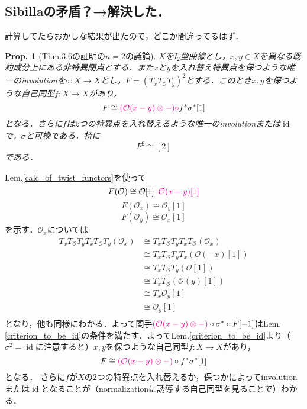 \documentclass[uplatex,a4paper,11pt]{jsarticle}
\makeatletter
\theoremstyle{mystyle} %
\newtheorem{proposition}{Prop.}[section]
\renewenvironment{proof}[1][\proofname]{\par
 \pushQED{\qed}%
 \normalfont \topsep6\p@\@plus6\p@\relax
 \trivlist
 \item[\hskip\labelsep
 \itshape
 {\bf\underline{#1}}]\ignorespaces
}{%
 \popQED\endtrivlist\@endpefalse
}
\DeclareMathOperator{\id}{id}
\makeatother
\begin{document}
\subsection*{Sibillaの矛盾？→解決した．}
計算してたらおかしな結果が出たので，どこか間違ってるはず．
\begin{proposition}[\cite{Sib14}Thm.3.6の証明の$n=2$の議論]\label{G_2 relation for the I_2 curve}
	$X$をI$_2$型曲線とし，$x, y \in X$を異なる既約成分上にある非特異閉点とする．また$x$と$y$を入れ替え特異点を保つような唯一のinvolutionを$\sigma \colon X \to X$とし，$F=(T_xT_\mathcal{O}T_y)^2$とする．このとき$x,y$を保つような自己同型$f \colon X \to X$があり，$$F \cong \textcolor{magenta}{(\mathcal{O}(x - y)\otimes - )\circ} f^*\sigma^*[1]$$となる．さらに$f$は2つの特異点を入れ替えるような唯一のinvolutionまたは$\id$で，$\sigma$と可換である．特に$$F^2 \cong[2]$$である．
\end{proposition}
\begin{proof}
	Lem.\ref{calc_of_twist_functors}を使って$$F(\mathcal{O})\cong \hbox{\sout{$\mathcal{O}[1]$}} \hspace{5pt}\textcolor{magenta}{\mathcal{O}(x - y)[1]}$$$$F(\mathcal{O}_x)\cong \mathcal{O}_y[1]$$$$F(\mathcal{O}_y)\cong \mathcal{O}_x[1]$$を示す．$\mathcal{O}_x$については
	\begin{align}
		T_xT_\mathcal{O}T_yT_xT_\mathcal{O}T_y(\mathcal{O}_x)
		 & \cong T_xT_\mathcal{O}T_yT_xT_\mathcal{O}(\mathcal{O}_x) \\
		 & \cong T_xT_\mathcal{O}T_yT_x(\mathcal{O}( - x)[1])       \\
		 & \cong T_xT_\mathcal{O}T_y(\mathcal{O}[1])                \\
		 & \cong T_xT_\mathcal{O}(\mathcal{O}(y)[1])                \\
		 & \cong T_x\mathcal{O}_y[1]                                \\
		 & \cong \mathcal{O}_y[1]                                   \\
	\end{align}
	となり，他も同様にわかる．よって関手$\textcolor{magenta}{(\mathcal{O}(x - y)\otimes - )}\circ\sigma^* \circ F[ - 1]$はLem.\ref{criterion_to_be_id}の条件を満たす．よってLem.\ref{criterion_to_be_id}より（$\sigma^2=\id$に注意すると）$x,y$を保つような自己同型$f \colon X \to X$があり，$$F \cong \textcolor{magenta}{(\mathcal{O}(x - y)\otimes - )}\circ f^*\sigma^*[1]$$となる．
	さらに$f$が$X$の2つの特異点を入れ替えるか，保つかによってinvolutionまたは$\id$となることが（normalizationに誘導する自己同型を見ることで）わかる．
\end{proof}
\end{document}
